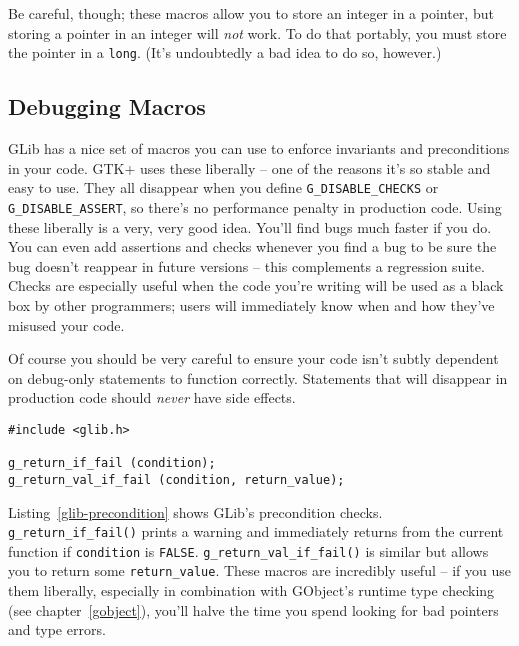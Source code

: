Be careful, though; these macros allow you to store an integer in a pointer, but storing a pointer in an integer will \emph{not} work. To do that portably, you must store the pointer in a \lstinline{long}. (It's undoubtedly a bad idea to do so, however.)

\subsection{Debugging Macros}

GLib has a nice set of macros you can use to enforce invariants and preconditions in your code. GTK+ uses these liberally -- one of the reasons it's so stable and easy to use. They all disappear when you define \lstinline{G_DISABLE_CHECKS} or \lstinline{G_DISABLE_ASSERT}, so there's no performance penalty in production code. Using these liberally is a very, very good idea. You'll find bugs much faster if you do. You can even add assertions and checks whenever you find a bug to be sure the bug doesn't reappear in future versions -- this complements a regression suite. Checks are especially useful when the code you're writing will be used as a black box by other programmers; users will immediately know when and how they've misused your code.

Of course you should be very careful to ensure your code isn't subtly dependent on debug-only statements to function correctly. Statements that will disappear in production code should \emph{never} have side effects.

\begin{lstlisting}[float, caption={Precondition Checks}, label=glib-precondition]
#include <glib.h>

g_return_if_fail (condition);
g_return_val_if_fail (condition, return_value);
\end{lstlisting}

Listing~\ref{glib-precondition} shows GLib's precondition checks. \lstinline{g_return_if_fail()} prints a warning and immediately returns from the current function if \lstinline{condition} is \lstinline{FALSE}. \lstinline{g_return_val_if_fail()} is similar but allows you to return some \lstinline{return_value}. These macros are incredibly useful -- if you use them liberally, especially in combination with GObject's runtime type checking (see chapter~\ref{gobject}), you'll halve the time you spend looking for bad pointers and type errors.

